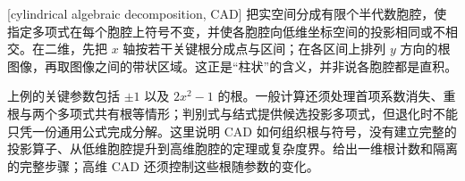 \ProseParagraphBreak
{}[cylindrical algebraic decomposition, CAD] 把实空间分成有限个半代数胞腔，使指定多项式在每个胞腔上符号不变，并使各胞腔向低维坐标空间的投影相同或不相交。在二维，先把 \(x\) 轴按若干关键根分成点与区间；在各区间上排列 \(y\) 方向的根图像，再取图像之间的带状区域。这正是“柱状”的含义，并非说各胞腔都是直积。

\ProseParagraphBreak
上例的关键参数包括 \(\pm1\) 以及 \(2x^2-1\) 的根。一般计算还须处理首项系数消失、重根与两个多项式共有根等情形；判别式与结式提供候选投影多项式，但退化时不能只凭一份通用公式完成分解。这里说明 CAD 如何组织根与符号，没有建立完整的投影算子、从低维胞腔提升到高维胞腔的定理或复杂度界。给出一维根计数和隔离的完整步骤；高维 CAD 还须控制这些根随参数的变化。
